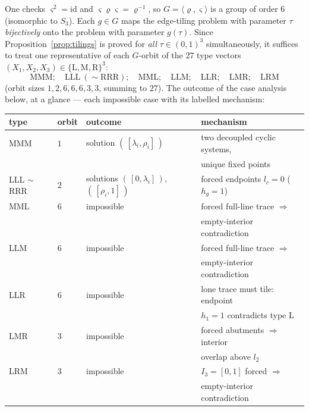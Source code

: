 \documentclass[11pt,reqno]{amsart}
\theoremstyle{plain}
\theoremstyle{definition}
\theoremstyle{remark}
\begin{document}
One checks $\varsigma^2=\mathrm{id}$ and
$\varsigma\varrho\varsigma=\varrho^{-1}$, so
$G=\langle\varrho,\varsigma\rangle$ is a group of order $6$ (isomorphic to
$S_3$). Each $g\in G$ maps the edge-tiling problem with parameter $\tau$
\emph{bijectively} onto the problem with parameter $g(\tau)$. Since
Proposition~\ref{prop:tilings} is proved for \emph{all} $\tau\in(0,1)^3$
simultaneously, it suffices to treat one representative of each $G$-orbit of
the $27$ type vectors $(X_1,X_2,X_3)\in\{\mathrm L,\mathrm M,\mathrm R\}^3$:
\[
\mathrm{MMM};\quad \mathrm{LLL}\ (\sim\mathrm{RRR});\quad \mathrm{MML};\quad
\mathrm{LLM};\quad \mathrm{LLR};\quad \mathrm{LMR};\quad \mathrm{LRM}
\]
(orbit sizes $1,2,6,6,6,3,3$, summing to $27$). The outcome of the case
analysis below, at a glance --- each impossible case with its labelled
mechanism:

\begin{center}
\begin{tabular}{@{}llll@{}}
\hline
type & orbit & outcome & mechanism\\
\hline
MMM & $1$ & solution $(\,[\lambda_i,\rho_i]\,)$ & two decoupled cyclic
systems,\\
 & & & unique fixed points\\
LLL $\sim$ RRR & $2$ & solutions $(\,[0,\lambda_i]\,)$, $(\,[\rho_i,1]\,)$
 & forced endpoints $l_c=0$ ($h_g=1$)\\
MML & $6$ & impossible & forced full-line trace $\Rightarrow$\\
 & & & empty-interior contradiction\\
LLM & $6$ & impossible & forced full-line trace $\Rightarrow$\\
 & & & empty-interior contradiction\\
LLR & $6$ & impossible & lone trace must tile: endpoint\\
 & & & $h_1=1$ contradicts type L\\
LMR & $3$ & impossible & forced abutments $\Rightarrow$ interior\\
 & & & overlap above $l_2$\\
LRM & $3$ & impossible & $I_3=[0,1]$ forced $\Rightarrow$\\
 & & & empty-interior contradiction\\
\hline
\end{tabular}
\end{center}
\end{document}
